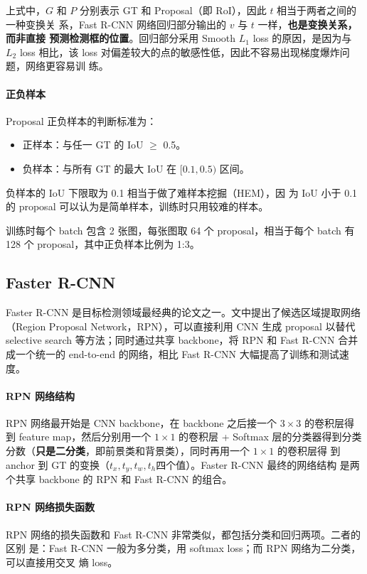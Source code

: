 上式中，$G$ 和 $P$ 分别表示 GT 和 Proposal（即 RoI），因此 $t$ 相当于两者之间的一种变换关
系，Fast R-CNN 网络回归部分输出的 $v$ 与 $t$ 一样，\textbf{也是变换关系，而非直接
  预测检测框的位置}。回归部分采用 Smooth $L_1$ loss 的原因，是因为与 $L_2$ loss
相比，该 loss 对偏差较大的点的敏感性低，因此不容易出现梯度爆炸问题，网络更容易训
练。

\paragraph{正负样本}
Proposal 正负样本的判断标准为：

\begin{itemize}
  \item 正样本：与任一 GT 的 IoU $ \geq $ 0.5。
  \item 负样本：与所有 GT 的最大 IoU 在 $ [0.1, 0.5) $ 区间。
\end{itemize}

负样本的 IoU 下限取为 0.1 相当于做了难样本挖掘（HEM），因
为 IoU 小于 0.1 的 proposal 可以认为是简单样本，训练时只用较难的样本。

训练时每个 batch 包含 2 张图，每张图取 64 个 proposal，相当于每个 batch 有 128
个 proposal，其中正负样本比例为 1:3。

\subsection{Faster R-CNN}
\label{subsec:Faster-R-CNN}

Faster R-CNN 是目标检测领域最经典的论文之一。文中提出了候选区域提取网络（Region
Proposal Network，RPN），可以直接利用 CNN 生成 proposal 以替代 selective search
等方法；同时通过共享 backbone，将 RPN 和 Fast R-CNN 合并成一个统一的 end-to-end
的网络，相比 Fast R-CNN 大幅提高了训练和测试速度。

\paragraph{RPN 网络结构}
RPN 网络最开始是 CNN backbone，在 backbone 之后接一个 $3 \times 3$ 的卷积层得
到 feature map，然后分别用一个 $1 \times 1$ 的卷积层 + Softmax 层的分类器得到分类
分数（\textbf{只是二分类}，即前景类和背景类），同时再用一个 $1 \times 1$ 的卷积层得
到 anchor 到 GT 的变换（$t_x, t_y, t_w, t_h$四个值）。Faster R-CNN 最终的网络结构
是两个共享 backbone 的 RPN 和 Fast R-CNN 的组合。

\paragraph{RPN 网络损失函数}
RPN 网络的损失函数和 Fast R-CNN 非常类似，都包括分类和回归两项。二者的区别
是：Fast R-CNN 一般为多分类，用 softmax loss；而 RPN 网络为二分类，可以直接用交叉
熵 loss。

